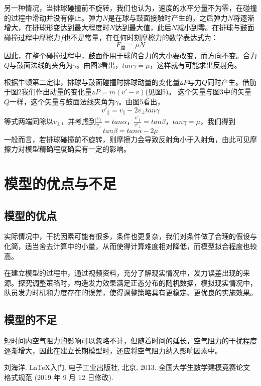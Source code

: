 \documentclass{cumcmthesis}
\begin{document}
另一种情况，当排球碰撞前不旋转，我们也认为，速度的水平分量不为零，在碰撞的过程中滑动并没有停止。弹力$N$是在球与鼓面接触时产生的，之后弹力$N$将逐渐增大，在排球形变达到最大程度时$N$达到最大值，此后$N$减小到零。在排球与鼓面碰撞过程中摩檫力$f$也不是常量，在任何时刻摩檫力的数学表达式为：
\begin{equation}
	F_\textrm{摩}=\mu N
\end{equation}
因此，在整个碰撞过程中，鼓面作用于球的合力的大小要改变，而方向不变。合力$Q$与鼓面法线的夹角为$\gamma$。由图3看出，$tan\gamma=\mu$，这样就有可能求出反射角。

根据牛顿第二定律，排球与鼓面碰撞时排球动量的变化量$\vartriangle P$与力$Q$同时产生。借肋于图2我们作出动量的变化量$\vartriangle P=m(v'-v)$(见图5)。
这个矢量与图3中的矢量$Q$一样，这个矢量与鼓面法线夹角为$\gamma$。由图5看出，
\begin{equation}
	v'_\parallel=v_\parallel-2v_\bot tan\gamma
\end{equation}
等式两端同除以$v_\bot$，并考虑到$\frac{v_\parallel}{v_\bot}=tan\alpha$，$\frac{v'_\parallel}{v'_\bot}=tan\beta$，$tan\gamma=\mu$，我们得到
\begin{equation}
	tan\beta=tan\alpha-2\mu
\end{equation}
一般而言，若排球碰撞前不旋转，则摩擦力会导致反射角小于入射角，由此可见摩擦力对模型精确程度确实有一定的影响。
\section{模型的优点与不足}
\subsection{模型的优点}
实际情况中，干扰因素可能有很多，条件也更复杂，我们对条件做了合理的假设与化简，适当舍去计算中的小量，从而使得计算难度相对降低，而模型拟合程度也较高。

在建立模型的过程中，通过视频资料，充分了解现实情况中，发力误差出现的来源。探究调整策略时，构造发力效果满足正态分布的随机数据，模拟现实情况中，队员发力时机和力度存在的误差，使得调整策略具有更稳定、更优良的实施效果。
\subsection{模型的不足}
短时间内空气阻力的影响可以忽略不计，但随着时间的延长，空气阻力的干扰程度逐渐增大，因此在建立长期模型时，还应将空气阻力纳入影响因素中。
\newpage

\begin{thebibliography}{9}%
    刘海洋.
    \newblock \LaTeX {}入门\allowbreak[J].
    \newblock 电子工业出版社, 北京, 2013.
    全国大学生数学建模竞赛论文格式规范 (2019 年 9 月 12 日修改).
\end{thebibliography}
\end{document}
